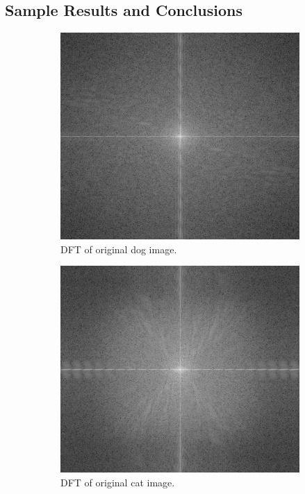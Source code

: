 \documentclass{article}
\begin{document}
\subsection{Sample Results and Conclusions}
\begin{figure}[!htb]
\begin{subfigure}{.5\textwidth}
  \centering
  \includegraphics[width=.8\textwidth]{dog_DFT.jpg}
  \caption{DFT of original dog image.}
\end{subfigure}%
\begin{subfigure}{.5\textwidth}
  \centering
  \includegraphics[width=.8\textwidth]{cat_DFT.jpg}
  \caption{DFT of original cat image.}
\end{subfigure}
\begin{subfigure}{.5\textwidth}
  \centering

\end{subfigure}
\end{figure}
\end{document}
